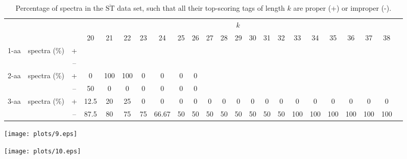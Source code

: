 \documentclass{article}
\def\STbar{{\overline{\mathrm{ST}}}}
\begin{document}
\begin{table}[ht]\footnotesize
\vspace{3mm}
{\centering
\begin{center}
\begin{tabular}{|c|cc|c|c|c|c|c|c|c|c|c|c|c|c|c|c|c|c|c|c|c|c|}
  \hline
  \multicolumn{3}{|c|}{ } & \multicolumn{ 19}{|c|}{$k$} \\
  \cline{4-22 }
  \multicolumn{3}{|c|}{ } 
 & 20 & 21 & 22 & 23 & 24 & 25 & 26 & 27 & 28 & 29 & 30 & 31 & 32 & 33 & 34 & 35 & 36 & 37 & 38\\
\hline
  \multirow{2}{*}{1-aa}& \multirow{2}{*}{spectra (\%)}  &  +
 &  &  &  &  &  &  &  &  &  &  &  &  &  &  &  &  &  &  & \\
 & 
 &  --
 &  &  &  &  &  &  &  &  &  &  &  &  &  &  &  &  &  &  & \\
\hline
  \multirow{2}{*}{2-aa}& \multirow{2}{*}{spectra (\%)}  &  +
 & 0 & 100 & 100 & 0 & 0 & 0 & 0 &  &  &  &  &  &  &  &  &  &  &  & \\
 & 
 &  --
 & 50 & 0 & 0 & 0 & 0 & 0 & 0 &  &  &  &  &  &  &  &  &  &  &  & \\
\hline
  \multirow{2}{*}{3-aa}& \multirow{2}{*}{spectra (\%)}  &  +
 & 12.5 & 20 & 25 & 0 & 0 & 0 & 0 & 0 & 0 & 0 & 0 & 0 & 0 & 0 & 0 & 0 & 0 & 0 & 0\\
 & 
 &  --
 & 87.5 & 80 & 75 & 75 & 66.67 & 50 & 50 & 50 & 50 & 50 & 50 & 50 & 50 & 100 & 100 & 100 & 100 & 100 & 100 \\
  \hline
\end{tabular}
\end{center}
\par}
\centering

\caption{Percentage of spectra in the $\STbar$ data set, such that all their top-scoring tags of length $k$ are proper (+) or improper (-).}

\vspace{3mm}
\label{table:all-top-scoring}
\end{table}
\texttt{[image: plots/9.eps]}

\texttt{[image: plots/10.eps]}
\end{document}
